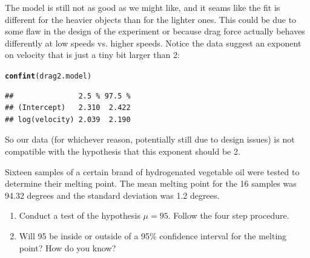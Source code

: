 \documentclass[twoside]{book}\usepackage[]{graphicx}\usepackage[]{xcolor}
\makeatletter
\newcommand{\hlstd}[1]{\textcolor[rgb]{0.345,0.345,0.345}{#1}}%
\newcommand{\hlkwd}[1]{\textcolor[rgb]{0.737,0.353,0.396}{\textbf{#1}}}%
\newenvironment{kframe}{%
 \def\at@end@of@kframe{}%
 \ifinner\ifhmode%
  \def\at@end@of@kframe{\end{minipage}}%
  \begin{minipage}{\columnwidth}%
 \fi\fi%
 \def\FrameCommand##1{\hskip\@totalleftmargin \hskip-\fboxsep
 \colorbox{shadecolor}{##1}\hskip-\fboxsep
     \hskip-\linewidth \hskip-\@totalleftmargin \hskip\columnwidth}%
 \MakeFramed {\advance\hsize-\width
   \@totalleftmargin\z@ \linewidth\hsize
   \@setminipage}}%
 {\par\unskip\endMakeFramed%
 \at@end@of@kframe}
\newenvironment{knitrout}{}{} %
\makeatother
\begin{document}
\begin{solution}
\begin{knitrout}
{}



\end{knitrout}
The model is still not as good as we might like, and it seams like the fit is different for the 
heavier objects than for the lighter ones.  This could be due to some flaw in the design of the 
experiment or because drag force actually behaves differently at low speeds vs. higher speeds.
Notice the data suggest an exponent on velocity that is just a tiny bit larger than 2:
\begin{knitrout}
\color{fgcolor}\begin{kframe}
\begin{alltt}
\hlkwd{confint}\hlstd{(drag2.model)}
\end{alltt}
\begin{verbatim}
##               2.5 % 97.5 %
## (Intercept)   2.310  2.422
## log(velocity) 2.039  2.190
\end{verbatim}
\end{kframe}
\end{knitrout}
So our data (for whichever reason, potentially still due to design issues) is not compatible 
with the hypothesis that this exponent should be 2.
\end{solution}

\begin{problem}
	Sixteen samples of a certain brand of hydrogenated vegetable oil were tested to determine 
	their melting point.  The mean melting point for the 16 samples was 94.32 degrees 
	and the standard deviation was 1.2 degrees.

	\begin{enumerate}
		\item
    Conduct a test of the hypothesis $\mu = 95$.  Follow the four step procedure.
\item
	Will 95 be inside or outside of a 95\% confidence interval for the melting point?
	How do you know?
	\end{enumerate}
\end{problem}
\end{document}
